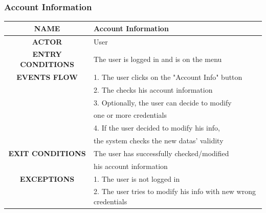 \documentclass[12pt,a4paper]{article}
\begin{document}
\subsubsection{Account Information}
\begin{center}
			\begin{tabular}{| c | l |}
				\hline
				\textbf{NAME} & Account Information \\
				\hline
				\textbf{ACTOR} & User \\
				\hline
				\textbf{ENTRY CONDITIONS} & The user is logged in and is on the menu \\
				\hline
				\textbf{EVENTS FLOW}  &
				1. The user clicks on the "Account Info" button\\
				&2. The checks his account information\\
				&3. Optionally, the user can decide to modify\\
				& one or more credentials\\
				&4. If the user decided to modify his info,\\
				& the system checks the new datas' validity\\
				\hline
				\textbf{EXIT CONDITIONS}  & The user has successfully checked/modified\\
				& his account information\\ 
				\hline
				\textbf{EXCEPTIONS} &
				1. The user is not logged in\\
				&2. The user tries to modify his info with new wrong credentials\\
				\hline
			\end{tabular}
		\end{center}
\end{document}
